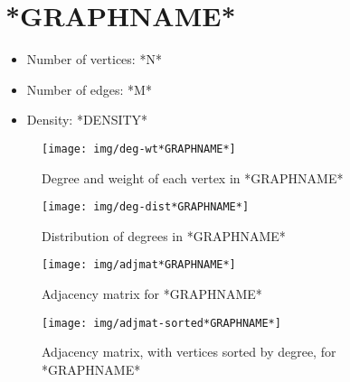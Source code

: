 \section{*GRAPHNAME*}

\begin{itemize}
    \item Number of vertices: *N*
    \item Number of edges: *M*
    \item Density: *DENSITY*
\end{itemize}

\begin{figure}[ht]
  \centering
  \texttt{[image: img/deg-wt*GRAPHNAME*]}
  \caption{Degree and weight of each vertex in *GRAPHNAME*}
\end{figure}

\begin{figure}[ht]
  \centering
  \texttt{[image: img/deg-dist*GRAPHNAME*]}
  \caption{Distribution of degrees in *GRAPHNAME*}
\end{figure}

\begin{figure}[ht]
  \centering
  \texttt{[image: img/adjmat*GRAPHNAME*]}
  \caption{Adjacency matrix for *GRAPHNAME*}
\end{figure}

\begin{figure}[ht]
  \centering
  \texttt{[image: img/adjmat-sorted*GRAPHNAME*]}
  \caption{Adjacency matrix, with vertices sorted by degree, for *GRAPHNAME*}
\end{figure}


